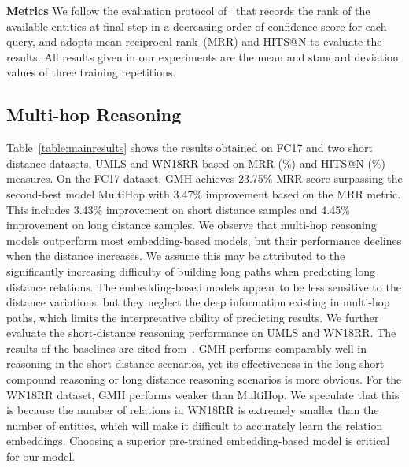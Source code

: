 
\noindent\textbf{Metrics}
We follow the evaluation protocol of~\cite{LinEMNLP2018} %
that records the rank of the available entities at final step in a decreasing order of confidence score for each query, and adopts mean reciprocal rank~(MRR) and HITS@N to evaluate the results.
All results given %
in our experiments %
are the mean and standard deviation values of three training repetitions. 







  

\subsection{Multi-hop Reasoning}
\label{sec:results}






Table~\ref{table:mainresults} shows the results obtained on FC17 and two short distance datasets, UMLS and WN18RR based on MRR (\%) and HITS@N (\%) measures.
On the FC17 dataset, GMH achieves 23.75\% MRR score surpassing the second-best model MultiHop with 3.47\% improvement based on the MRR metric. This includes 3.43\% improvement on short distance samples and 4.45\% improvement on long distance samples.
We observe that multi-hop reasoning models outperform most embedding-based models, but their performance declines when the distance increases. We assume this may be attributed to the significantly increasing difficulty of building long paths when predicting long distance relations. 
The embedding-based models appear to be less sensitive to the distance variations, but they neglect the deep information existing in multi-hop paths, which limits the interpretative ability of predicting results. 
We further evaluate the short-distance reasoning performance on UMLS and WN18RR.
The results of %
the baselines
are cited from~\cite{LinEMNLP2018}. 
GMH performs comparably well in reasoning in the short distance scenarios, yet its effectiveness in the long-short compound reasoning or long distance reasoning scenarios is more obvious.
For the WN18RR dataset, GMH performs weaker than MultiHop.
We speculate that this is because the number of relations in WN18RR is extremely smaller than the number of entities, which will make it difficult to accurately learn the relation embeddings.
Choosing a superior pre-trained embedding-based model is critical for our model.


